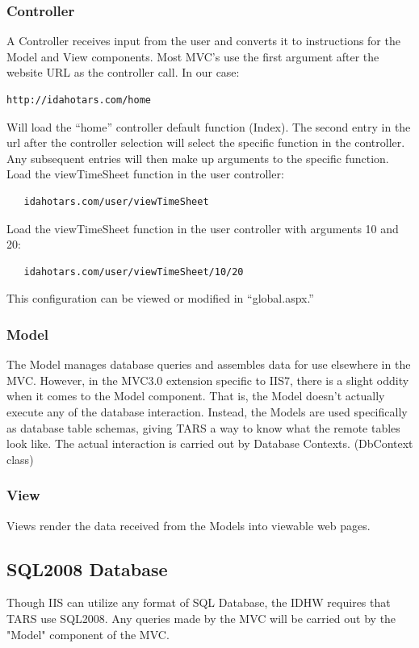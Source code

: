 \documentclass[letterpaper]{article}
\begin{document}
\subsubsection{Controller}
A Controller receives input from the user and converts it to instructions for the Model and View components. Most MVC's use the first argument after the website URL as the controller call. In our case:\\
\begin{verbatim}
http://idahotars.com/home
\end{verbatim}
Will load the ``home'' controller default function (Index). The second entry in the url after the controller selection will select the specific function in the controller. Any subsequent entries will then make up arguments to the specific function.\\
Load the viewTimeSheet function in the user controller:
\begin{verbatim}
   idahotars.com/user/viewTimeSheet 
\end{verbatim}
Load the viewTimeSheet function in the user controller with arguments 10 and 20:
\begin{verbatim}
   idahotars.com/user/viewTimeSheet/10/20
\end{verbatim}
This configuration can be viewed or modified in ``global.aspx.''  

\subsubsection{Model}
The Model manages database queries and assembles data for use elsewhere in the MVC. However, in the MVC3.0 extension specific to IIS7, there is a slight oddity when it comes to the Model component. That is, the Model doesn't actually execute any of the database interaction. Instead, the Models are used specifically as database table schemas, giving TARS a way to know what the remote tables look like. The actual interaction is carried out by Database Contexts. (DbContext class)
\subsubsection{View}
Views render the data received from the Models into viewable web pages.
\subsection{SQL2008 Database}
Though IIS can utilize any format of SQL Database, the IDHW requires that TARS use SQL2008. Any queries made by the MVC will be carried out by the "Model" component of the MVC. \\
\\
\end{document}
